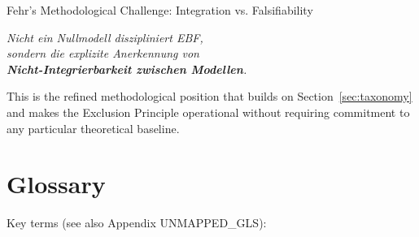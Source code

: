 \begin{chapter}{Fehr's Methodological Challenge: Integration vs. Falsifiability}
\begin{tcolorbox}[colback=red!5!white,colframe=red!75!black,title=\textbf{The Key Insight (Memorize)}]
\begin{center}
\textit{Nicht ein Nullmodell diszipliniert EBF,\\
sondern die explizite Anerkennung von\\
\textbf{Nicht-Integrierbarkeit zwischen Modellen}.}
\end{center}
\end{tcolorbox}

This is the refined methodological position that builds on Section~\ref{sec:taxonomy}
and makes the Exclusion Principle operational without requiring commitment to any
particular theoretical baseline.


\section{Glossary}
\label{sec:glossary}

Key terms (see also Appendix UNMAPPED_GLS):


\end{chapter}
